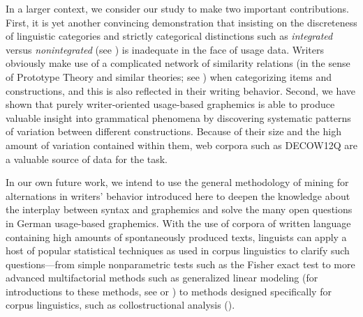 In a larger context, we consider our study to make two important contributions. First, it is yet another convincing demonstration that insisting on the discreteness of linguistic categories and strictly categorical distinctions such as \textit{integrated} versus \textit{nonintegrated} (see ) is inadequate in the face of usage data. Writers obviously make use of a complicated network of similarity relations (in the sense of Prototype Theory and similar theories; see ) when categorizing items and constructions, and this is also reflected in their writing behavior. Second, we have shown that purely writer-oriented usage-based graphemics is able to produce valuable insight into grammatical phenomena by discovering systematic patterns of variation between different constructions. Because of their size and the high amount of variation contained within them, web corpora such as DECOW12Q are a valuable source of data for the task.



In our own future work, we intend to use the general methodology of mining for alternations in writers’ behavior introduced here to deepen the knowledge about the interplay between syntax and graphemics and solve the many open questions in German usage-based graphemics. With the use of corpora of written language containing high amounts of spontaneously produced texts, linguists can apply a host of popular statistical techniques as used in corpus linguistics to clarify such questions—from simple nonparametric tests such as the Fisher exact test to more advanced multifactorial methods such as generalized linear modeling (for introductions to these methods, see \citealt{Baayen2008} or \citealt{Gries2013}) to methods designed specifically for corpus linguistics, such as collostructional analysis (\citealt{StefanowitschGries2003}).


